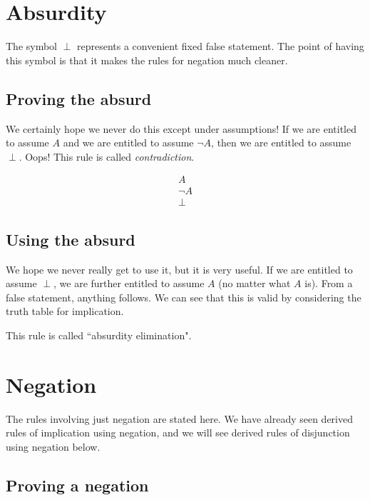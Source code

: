 \documentclass[12pt]{book}
\begin{document}
\section{Absurdity}

The symbol $\perp$ represents a convenient fixed false statement.   The point of having this symbol is that it makes the rules for negation much cleaner.

\subsection{Proving the absurd}

We certainly hope we never do this except under assumptions!  If we are entitled to assume $A$ and we are entitled to assume $\neg A$, then we are entitled to assume $\perp$.  Oops!  This rule is called {\em contradiction\/}.

$$\begin{array}{r} A \\ \neg A \\ \hline \perp \end{array}$$

\subsection{Using the absurd}

We hope we never really get to use it, but it is very useful.  If we are entitled to assume $\perp$, we are further entitled to assume $A$ (no matter what $A$ is).  From a false statement, anything follows.  We can see that this is valid by considering the truth table for implication.

This rule is called ``absurdity elimination".

\section{Negation}

The rules involving just negation are stated here.  We have already seen derived rules of implication using negation, and we will see derived rules of disjunction using negation below.

\subsection{Proving a negation}
\end{document}
